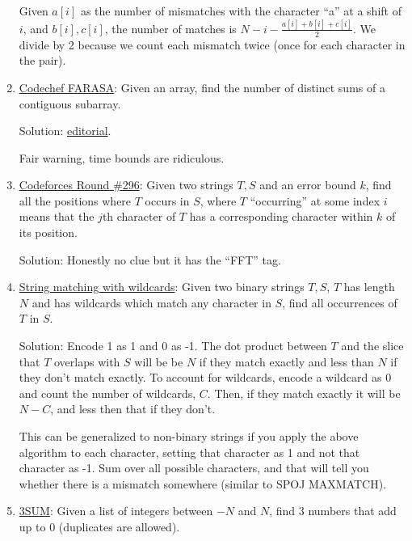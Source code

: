 \documentclass[11pt, oneside]{article}
\theoremstyle{plain}
\theoremstyle{definition}
\begin{document}
\begin{enumerate}
    Given \( a[i] \) as the number of mismatches with the character \enquote{a}
    at a shift of \( i \), and \( b[i], c[i] \), the number of matches is 
    \( N - i - \frac{a[i] + b[i] + c[i]}{2} \). We divide by 2 because we
    count each mismatch twice (once for each character in the pair).

  \item \href{https://www.codechef.com/problems/FARASA}{Codechef FARASA}:
    Given an array, find the number of distinct sums of a contiguous subarray.

    Solution: \href{https://discuss.codechef.com/t/farasa-editorial/2688}
    {editorial}.

    Fair warning, time bounds are ridiculous.

  \item \href{https://codeforces.com/contest/528/problem/D}
    {Codeforces Round \#296}: Given two strings \( T, S \) and 
    an error bound \( k \), find all the positions where \( T \) occurs
    in \( S \), where \( T \) \enquote{occurring} at some index \( i \) 
    means that the \( j \)th character of \( T \) has a corresponding character
    within \( k \) of its position.

    Solution: Honestly no clue but it has the \enquote{FFT} tag.

  \item \href{https://cs.stanford.edu/~rishig/courses/ref/l17.txt}
    {String matching with wildcards}: Given two binary strings \( T, S \),
    \( T \) has length \( N \) and has wildcards which match any character
    in \( S \), find all occurrences of \( T \) in \( S \).

    Solution: Encode 1 as 1 and 0 as -1. The dot product between \( T \)
    and the slice that \( T \) overlaps with \( S \) will be be \( N \)
    if they match exactly and less than \( N \) if they don't match exactly.
    To account for wildcards, encode a wildcard as \( 0 \) and count the
    number of wildcards, \( C \). Then, if they match exactly it will be
    \( N - C \), and less then that if they don't.

    This can be generalized to non-binary strings if you apply the above
    algorithm to each character, setting that character as 1 and not that
    character as -1. Sum over all possible characters, and that will tell you
    whether there is a mismatch somewhere (similar to SPOJ MAXMATCH).

  \item \href{https://en.wikipedia.org/wiki/3SUM}{3SUM}:
    Given a list of integers between \( -N \) and \( N \),
    find 3 numbers that add up to 0 (duplicates are allowed). 


\end{enumerate}
\end{document}

